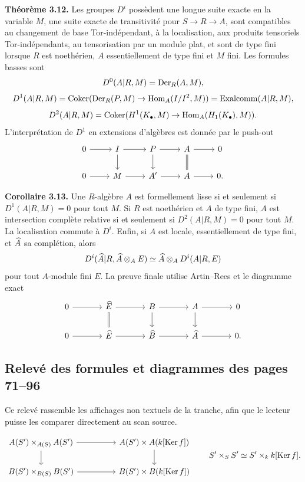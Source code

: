 \documentclass[11pt]{article}
\providecommand{\Ker}{\operatorname{Ker}}
\providecommand{\Hom}{\operatorname{Hom}}
\begin{document}
\textbf{Théorème 3.12.}  Les groupes \(D^i\) possèdent une longue suite exacte en la variable \(M\), une suite exacte de transitivité pour \(S\to R\to A\), sont compatibles au changement de base Tor-indépendant, à la localisation, aux produits tensoriels Tor-indépendants, au tensorisation par un module plat, et sont de type fini lorsque \(R\) est noethérien, \(A\) essentiellement de type fini et \(M\) fini.  Les formules basses sont
\[
D^0(A|R,M)=\operatorname{Der}_R(A,M),
\]
\[
D^1(A|R,M)=\Coker(\Der_R(P,M)\to\Hom_A(I/I^2,M))=\Exalcomm(A|R,M),
\]
\[
D^2(A|R,M)=\Coker(H^1(K_\bullet,M)\to\Hom_A(H_1(K_\bullet),M)).
\]
L'interprétation de \(D^1\) en extensions d'algèbres est donnée par le push-out
\[
\begin{tikzcd}
0\arrow[r]&I\arrow[r]\arrow[d]&P\arrow[r]\arrow[d]&A\arrow[r]\arrow[d,equal]&0\\
0\arrow[r]&M\arrow[r]&A'\arrow[r]&A\arrow[r]&0.
\end{tikzcd}
\]

\textbf{Corollaire 3.13.}  Une \(R\)-algèbre \(A\) est formellement lisse si et seulement si \(D^1(A|R,M)=0\) pour tout \(M\).  Si \(R\) est noethérien et \(A\) de type fini, \(A\) est intersection complète relative si et seulement si \(D^2(A|R,M)=0\) pour tout \(M\).  La localisation commute à \(D^i\).  Enfin, si \(A\) est locale, essentiellement de type fini, et \(\widehat A\) sa complétion, alors
\[
D^i(\widehat A|R,\widehat A\otimes_AE)\simeq \widehat A\otimes_A D^i(A|R,E)
\]
pour tout \(A\)-module fini \(E\).  La preuve finale utilise Artin--Rees et le diagramme exact
\[
\begin{tikzcd}[column sep=large]
0\arrow[r]&\Ehat\arrow[r]\arrow[d,equal]&B\arrow[r]\arrow[d]&A\arrow[r]\arrow[d]&0\\
0\arrow[r]&\Ehat\arrow[r]&\Bhat\arrow[r]&\Ahat\arrow[r]&0.
\end{tikzcd}
\]


\subsection*{Relevé des formules et diagrammes des pages 71--96}

Ce relevé rassemble les affichages non textuels de la tranche, afin que le lecteur puisse les comparer directement au scan source.

\[
\begin{tikzcd}[column sep=huge]
A(S')\times_{A(S)}A(S') \arrow[r] \arrow[d] & A(S')\times A(k[\Ker f]) \arrow[d] \\
B(S')\times_{B(S)}B(S') \arrow[r] & B(S')\times B(k[\Ker f])
\end{tikzcd}
\qquad
S'\times_SS'\simeq S'\times_k k[\Ker f].
\]
\end{document}
